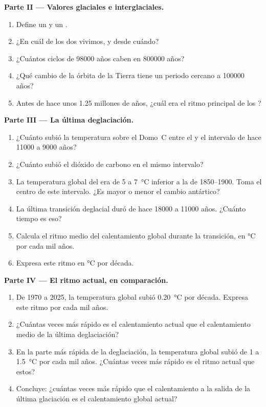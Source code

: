 \begin{problem}
\medskip
\noindent\textbf{Parte II --- Valores glaciales e interglaciales.}
\begin{enumerate}[resume]
  \item Define un  y un .
  \item ¿En cuál de los dos vivimos, y desde cuándo?
  \item ¿Cuántos ciclos de \num{98000} años caben en \num{800000} años?
  \item ¿Qué cambio de la órbita de la Tierra tiene un periodo cercano a
        \num{100000} años?
  \item Antes de hace unos 1.25 millones de años, ¿cuál era el ritmo principal de
        los ?
\end{enumerate}

\medskip
\noindent\textbf{Parte III --- La última deglaciación.}
\begin{enumerate}[resume]
  \item ¿Cuánto subió la temperatura sobre el Domo~C entre el  y el intervalo de hace \num{11000} a \num{9000} años?
  \item ¿Cuánto subió el dióxido de carbono en el mismo intervalo?
  \item La temperatura global del  era de 5 a
        \qty{7}{\degreeCelsius} inferior a la de 1850--1900. Toma el centro de
        este intervalo. ¿Es mayor o menor el cambio antártico?
  \item La última transición deglacial duró de hace \num{18000} a
        \num{11000} años. ¿Cuánto tiempo es eso?
  \item Calcula el ritmo medio del calentamiento global durante la transición, en
        \unit{\degreeCelsius} por cada mil años.
  \item Expresa este ritmo en \unit{\degreeCelsius} por década.
\end{enumerate}

\medskip
\noindent\textbf{Parte IV --- El ritmo actual, en comparación.}
\begin{enumerate}[resume]
  \item De 1970 a 2025, la temperatura global subió
        \qty{0.20}{\degreeCelsius} por década. Expresa este ritmo por
        cada mil años.
  \item ¿Cuántas veces más rápido es el calentamiento actual que el calentamiento medio de
        la última deglaciación?
  \item En la parte más rápida de la deglaciación, la temperatura global subió
        de 1 a \qty{1.5}{\degreeCelsius} por cada mil años. ¿Cuántas veces
        más rápido es el ritmo actual que estos?
  \item Concluye: ¿cuántas veces más rápido que el calentamiento a la salida de la última
        glaciación es el calentamiento global actual?
\end{enumerate}
\end{problem}
